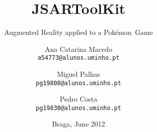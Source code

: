 \documentclass[abstract=on,9pt,twocolumn]{scrartcl}
\title{JSARToolKit}
\subtitle{Augmented Reality applied to a Pokémon\textsuperscript{\textregistered}\ Game}
\author{Ana Catarina Macedo\\\texttt{\smaller a54773@alunos.uminho.pt}
\and Miguel Palhas\\\texttt{\smaller pg19808@alunos.uminho.pt}
\and Pedro Costa\\\texttt{\smaller pg19830@alunos.uminho.pt}}
\date{Braga, June 2012}
\begin{document}
\maketitle







\nocite{jsartoolkit}
\nocite{heikkinen2012}
\nocite{bulbapedia}



\appendix


%
\end{document}
